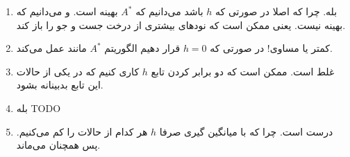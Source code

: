 \begin{enumerate}
    \item بله. چرا که اصلا در صورتی که $h$  باشد می‌دانیم که $A^*$ بهینه است. و می‌دانیم که  بهینه نیست.
    یعنی ممکن است که  نود‌های بیشتری از درخت جست و جو را باز کند.
    \item کمتر یا مساوی! در صورتی که $h = 0$ قرار دهیم الگوریتم $A^*$ مانند  عمل می‌کند.
    \item غلط است. ممکن است که دو برابر کردن تابع $h$ کاری کنیم که در یکی از حالات این تابع بدبینانه بشود.
    \item بله TODO
    \item درست است. چرا که با میانگین گیری صرفا $h$ هر کدام از حالات را کم می‌کنیم. پس همچنان
    می‌ماند.
\end{enumerate}